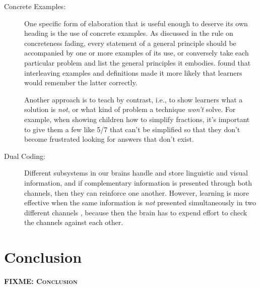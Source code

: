 \documentclass[10pt,letterpaper]{article}
\newcommand{\fixme}[1]{\textsc{\textbf{FIXME: {#1}}}}
\begin{document}
\begin{description}
\item[Concrete Examples:] One specific form of elaboration that is useful enough
  to deserve its own heading is the use of concrete examples.  As discussed in
  the rule on concreteness fading, every statement of a general principle should
  be accompanied by one or more examples of its use, or conversely take each
  particular problem and list the general principles it
  embodies. \cite{Raws2014} found that interleaving examples and definitions
  made it more likely that learners would remember the latter correctly.

  Another approach is to teach by contrast, i.e., to show learners what a
  solution is \emph{not}, or what kind of problem a technique \emph{won't}
  solve. For example, when showing children how to simplify fractions, it's
  important to give them a few like 5/7 that can't be simplified so that they
  don't become frustrated looking for answers that don't exist.

\item[Dual Coding:] Different subsystems in our brains handle and store
  linguistic and visual information, and if complementary information is
  presented through both channels, then they can reinforce one another. However,
  learning is more effective when the same information is \emph{not} presented
  simultaneously in two different channels \cite{Maye2003,Maye2009}, because then
  the brain has to expend effort to check the channels against each other.

\end{description}

\section*{Conclusion}

\fixme{Conclusion}


\end{document}
